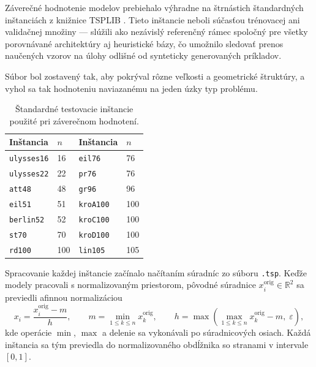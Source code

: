 \indent Záverečné hodnotenie modelov prebiehalo výhradne na štrnástich
štandardných inštanciách z knižnice TSPLIB
\parencite{reinelt1991tsplib}. Tieto inštancie neboli súčasťou
trénovacej ani validačnej množiny — slúžili ako nezávislý referenčný
rámec spoločný pre všetky porovnávané architektúry aj heuristické bázy,
čo umožnilo sledovať prenos naučených vzorov na úlohy odlišné od
synteticky generovaných príkladov.

\indent Súbor bol zostavený tak, aby pokrýval rôzne veľkosti
a geometrické štruktúry, a vyhol sa tak hodnoteniu naviazanému na
jeden úzky typ problému.

\begin{table}[H]
    \centering
    \small
    \caption{Štandardné testovacie inštancie použité pri záverečnom hodnotení.}
    \label{tab:tsplib_instances}
    \begin{tabular}{|p{3.0cm}|p{1.0cm}|p{3.0cm}|p{1.0cm}|}
        \hline
        Inštancia & \(n\) & Inštancia & \(n\) \\
        \hline
        \texttt{ulysses16} & 16 & \texttt{eil76}   & 76  \\
        \hline
        \texttt{ulysses22} & 22 & \texttt{pr76}    & 76  \\
        \hline
        \texttt{att48}     & 48 & \texttt{gr96}    & 96  \\
        \hline
        \texttt{eil51}     & 51 & \texttt{kroA100} & 100 \\
        \hline
        \texttt{berlin52}  & 52 & \texttt{kroC100} & 100 \\
        \hline
        \texttt{st70}      & 70 & \texttt{kroD100} & 100 \\
        \hline
        \texttt{rd100}     & 100 & \texttt{lin105} & 105 \\
        \hline
    \end{tabular}
    \normalsize
\end{table}

\indent Spracovanie každej inštancie začínalo načítaním súradníc
zo súboru \texttt{.tsp}. Keďže modely pracovali s normalizovaným
priestorom, pôvodné súradnice
\(x_i^{\mathrm{orig}} \in \mathbb{R}^2\) sa previedli afinnou
normalizáciou
\begin{equation}
x_i = \frac{x_i^{\mathrm{orig}} - m}{h},
\qquad
m = \min_{1 \leq k \leq n} x_k^{\mathrm{orig}},
\qquad
h = \max\!\left(\max_{1 \leq k \leq n} x_k^{\mathrm{orig}} - m,\;
\varepsilon\right),
\label{eq:tsplib_normalization}
\end{equation}
kde operácie \(\min\), \(\max\) a delenie sa vykonávali po
súradnicových osiach. Každá inštancia sa tým previedla do
normalizovaného obdĺžnika so stranami v intervale \([0,1]\).

